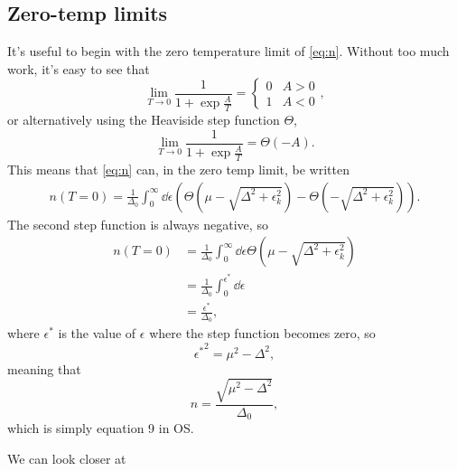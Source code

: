 \documentclass{article}
\newcommand{\corr}{\mu}
\newcommand{\step}{\Theta}
\begin{document}
\subsection{Zero-temp limits} \label{subsec:zerotemp}
It's useful to begin with the zero temperature limit of \cref{eq:n}.
Without too much work, it's easy to see that
\begin{equation}
	\lim_{T\rightarrow 0} \frac{1}{1 + \exp\frac{A}{T}} = \begin{cases}
		0 & A > 0 \\
		1 & A < 0
	\end{cases},
\end{equation}
or alternatively using the Heaviside step function $\step$,
\begin{equation}
	\lim_{T\rightarrow 0} \frac{1}{1 + \exp\frac{A}{T}} = \step(- A).
\end{equation}
This means that \cref{eq:n} can, in the zero temp limit, be written
\begin{align}
	n(T = 0) = \frac{1}{\Delta_0} \int_0^\infty \dd{\epsilon} \left(\step\left(\corr - \sqrt{\Delta^2 + \epsilon_k^2}\right) - \step\left(- \sqrt{\Delta^2 + \epsilon_k^2}\right) \right).
\end{align}
The second step function is always negative, so
\begin{align}
	n(T = 0) &= \frac{1}{\Delta_0} \int_0^\infty \dd{\epsilon} \step\left(\corr - \sqrt{\Delta^2 + \epsilon_k^2}\right) \\
	&= \frac{1}{\Delta_0} \int_0^{\epsilon^\ast} \dd{\epsilon}  \\
	&= \frac{\epsilon^\ast}{\Delta_0},
\end{align}
where $\epsilon^\ast$ is the value of $\epsilon$ where the step function becomes zero, so
\begin{equation}
	{\epsilon^\ast}^2 = \corr^2 - \Delta^2,
\end{equation}
meaning that
\begin{equation}
	n = \frac{\sqrt{\corr^2 - \Delta^2}}{\Delta_0},
\end{equation}
which is simply equation 9 in OS.

We can look closer at 

\printbibliography
\end{document}
